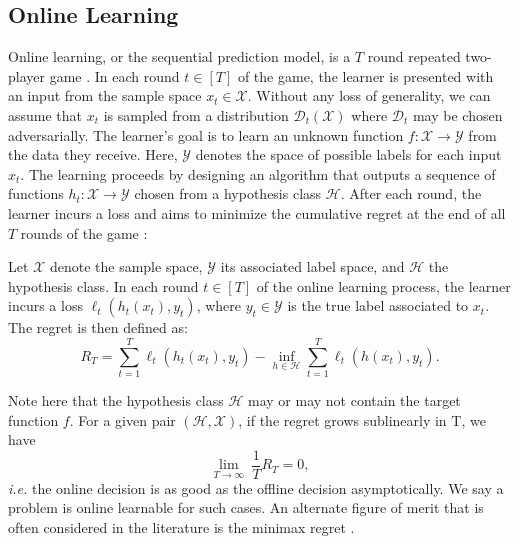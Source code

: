 
\subsection{Online Learning}

Online learning, or the sequential prediction model, is a $T$ round repeated two-player game \citep{online_book}. In each round $t \in [T]$ of the game, the learner is presented with an input from the sample space $x_t \in \mathcal{X}$. Without any loss of generality, we can assume that $x_t$ is sampled from a distribution $\mathcal{D}_t(\mathcal{X})$ where $\mathcal{D}_t$ may be chosen adversarially. The learner's goal is to learn an unknown function $f: \mathcal{X} \rightarrow \mathcal{Y}$ from the data they receive. Here, $\mathcal{Y}$ denotes the space of possible labels for each input $x_t$. The learning proceeds by designing an algorithm that outputs a sequence of functions $h_t:\mathcal{X} \rightarrow \mathcal{Y}$ chosen from a hypothesis class $\mathcal H$. After each round, the learner incurs a loss and aims to minimize the cumulative regret at the end of all $T$ rounds of the game \citep{cesa1997_expert, arora2012multiplicative}:

\begin{definition}[Regret]
\label{def:regret}
    Let $\mathcal{X}$ denote the sample space, $\mathcal{Y}$ its associated label space, and $\mathcal{H}$ the hypothesis class. In each round $t \in [T]$ of the online learning process, the learner incurs a loss $\ell_t (h_t(x_t), y_t)$, where $y_t \in \mathcal{Y}$ is the true label associated to $x_t$. The regret is then defined as:
    \begin{equation*}
    R_T = \sum_{t=1}^T \ell_t (h_t (x_t), y_t) - \inf_{h \in \mathcal{H}} \sum_{t=1}^T \ell_t(h(x_t), y_t).
    \end{equation*}
\end{definition}

Note here that the hypothesis class $\mathcal{H}$ may or may not contain the target function $f$. For a given pair $(\mathcal{H}, \mathcal{X})$, if the regret grows sublinearly in T, we have
\begin{equation}
    \lim_{T \rightarrow \infty} \  \frac{1}{T}R_T = 0,
\end{equation}
{\it i.e.} the online decision is as good as the offline decision asymptotically.
We say a problem is online learnable for such cases. An alternate figure of merit that is often considered in the literature is the minimax regret \citep{rakhlin2015online}.

